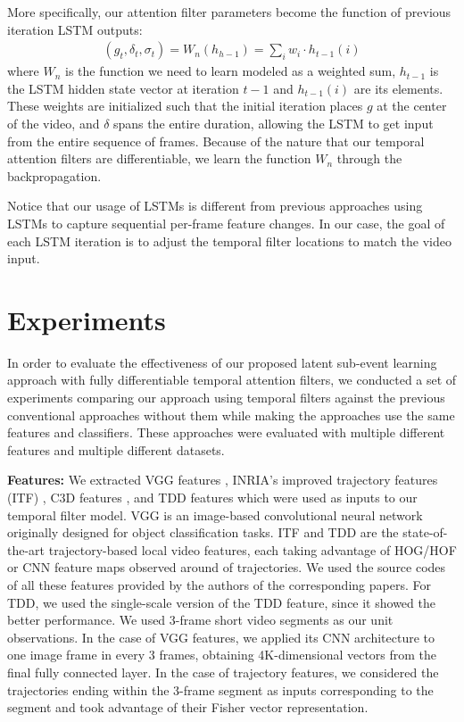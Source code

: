\documentclass[letterpaper]{article}
\begin{document}
More specifically, our attention filter parameters become the function of previous iteration LSTM outputs:
\begin{equation} \label{eq:mrf_match}
\begin{split}
(g_t, \delta_t, \sigma_t) = W_n(h_{h-1}) = \sum_i w_i \cdot h_{t-1}(i)
\end{split}
\end{equation}
where $W_n$ is the function we need to learn modeled as a weighted sum, $h_{t-1}$ is the LSTM hidden state vector at iteration $t-1$ and $h_{t-1}(i)$ are its elements. These weights are initialized such that the initial iteration places $g$ at the center of the video, and $\delta$ spans the entire duration, allowing the LSTM to get input from the entire sequence of frames. Because of the nature that our temporal attention filters are differentiable, we learn the function $W_n$ through the backpropagation.

Notice that our usage of LSTMs is different from previous approaches \cite{google15} using LSTMs to capture sequential per-frame feature changes. In our case, the goal of each LSTM iteration is to adjust the temporal filter locations to match the video input.



\section{Experiments}

In order to evaluate the effectiveness of our proposed latent sub-event learning approach with fully differentiable temporal attention filters, we conducted a set of experiments comparing our approach using temporal filters against the previous conventional approaches without them while making the approaches use the same features and classifiers. These approaches were evaluated with multiple different features and multiple different datasets.

{\flushleft\textbf{Features:} We extracted VGG features \cite{vgg}, INRIA's improved trajectory features (ITF) \cite{wang13}, C3D features \cite{c3d}, and TDD features \cite{tdd15} which were used as inputs to our temporal filter model. VGG is an image-based convolutional neural network originally designed for object classification tasks. ITF and TDD are the state-of-the-art trajectory-based local video features, each taking advantage of HOG/HOF or CNN feature maps observed around of trajectories. We used the source codes of all these features provided by the authors of the corresponding papers. For TDD, we used the single-scale version of the TDD feature, since it showed the better performance. We used 3-frame short video segments as our unit observations. In the case of VGG features, we applied its CNN architecture to one image frame in every 3 frames, obtaining 4K-dimensional vectors from the final fully connected layer. In the case of trajectory features, we considered the trajectories ending within the 3-frame segment as inputs corresponding to the segment and took advantage of their Fisher vector representation.}
\end{document}
